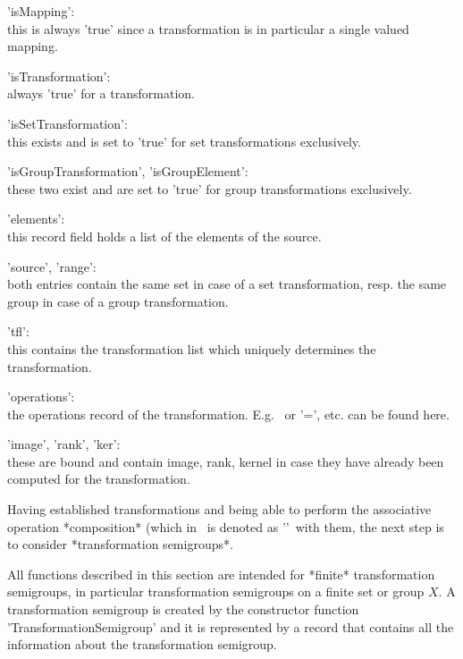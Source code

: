 'isMapping': \\ 
  this is always 'true' since a transformation is in particular a single
  valued mapping.

'isTransformation': \\    
  always 'true' for a transformation.

'isSetTransformation': \\  
  this exists and is set to 'true' for set transformations exclusively.

'isGroupTransformation', 'isGroupElement': \\
  these two exist and are set to 'true' for group transformations 
  exclusively.

'elements': \\
  this record field holds a list of the elements of the source.

'source', 'range': \\
  both entries contain the same set in case of a set transformation, resp.
  the same group in case of a group transformation.

'tfl': \\                   
  this contains the transformation list which uniquely determines the 
  transformation.

'operations': \\
  the operations record of the transformation. E.g. \*\ or '=', etc.
  can be found here.

'image', 'rank', 'ker': \\
  these are bound and contain image, rank, kernel in case they have 
  already been computed for the transformation.



Having established transformations and being able to perform the associative 
operation *composition* (which in \GAP\ is denoted as '\*'\ with 
them, the next step is to consider *transformation semigroups*.

All functions described in this section are intended for *finite*
transformation semigroups, in particular transformation semigroups
on a finite set or group $X$.
A transformation semigroup is created by the constructor function 
'Trans\-for\-ma\-tion\-Semi\-group' and it is represented by a record 
that contains all the information about the transformation semigroup. 

